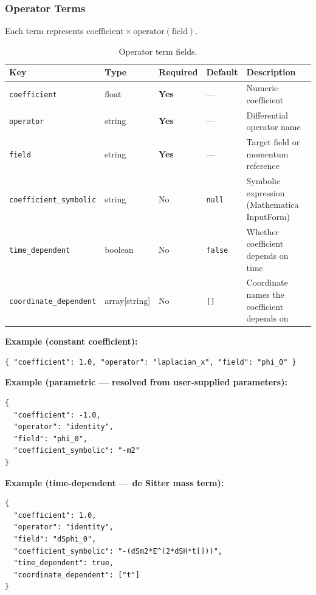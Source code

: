 \subsubsection{Operator Terms}
\label{sec:json-operator-terms}

Each term represents $\text{coefficient} \times \text{operator}(\text{field})$.

\begin{table}[htbp]
\centering
\caption{Operator term fields.}
\label{tab:json-operator-terms}
\begin{tabular}{@{}lllll@{}}
\toprule
Key & Type & Required & Default & Description \\
\midrule
\texttt{coefficient}          & float         & \textbf{Yes} & ---     & Numeric coefficient \\
\texttt{operator}             & string        & \textbf{Yes} & ---     & Differential operator name \\
\texttt{field}                & string        & \textbf{Yes} & ---     & Target field or momentum reference \\
\texttt{coefficient\_symbolic} & string        & No       & \texttt{null} & Symbolic expression (Mathematica InputForm) \\
\texttt{time\_dependent}       & boolean       & No       & \texttt{false} & Whether coefficient depends on time \\
\texttt{coordinate\_dependent} & array[string] & No       & \texttt{[]} & Coordinate names the coefficient depends on \\
\bottomrule
\end{tabular}
\end{table}

\textbf{Example (constant coefficient):}

\begin{lstlisting}[style=json]
{ "coefficient": 1.0, "operator": "laplacian_x", "field": "phi_0" }
\end{lstlisting}

\textbf{Example (parametric --- resolved from user-supplied parameters):}

\begin{lstlisting}[style=json]
{
  "coefficient": -1.0,
  "operator": "identity",
  "field": "phi_0",
  "coefficient_symbolic": "-m2"
}
\end{lstlisting}

\textbf{Example (time-dependent --- de Sitter mass term):}

\begin{lstlisting}[style=json]
{
  "coefficient": 1.0,
  "operator": "identity",
  "field": "dSphi_0",
  "coefficient_symbolic": "-(dSm2*E^(2*dSH*t[]))",
  "time_dependent": true,
  "coordinate_dependent": ["t"]
}
\end{lstlisting}

